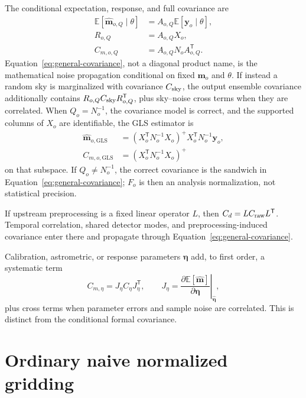 \documentclass[11pt]{article}
\newcommand{\E}{\mathbb{E}}
\newcommand{\trans}{\mathsf{T}}
\begin{document}
The conditional expectation, response, and full covariance are
\begin{align}
  \E[\widehat{\boldsymbol m}_{o,Q}\mid\theta]
    &= A_{o,Q}\E[\boldsymbol y_o\mid\theta],
  \label{eq:general-mean}\\
  R_{o,Q} &= A_{o,Q}X_o,
  \label{eq:general-response}\\
  C_{m,o,Q}
    &= A_{o,Q}N_oA_{o,Q}^\trans .
  \label{eq:general-covariance}
\end{align}
Equation~\eqref{eq:general-covariance}, not a diagonal product name, is the
mathematical noise propagation conditional on fixed \(\boldsymbol m_o\) and
\(\theta\). If instead a random sky is marginalized with covariance
\(C_{\rm sky}\), the output ensemble covariance additionally contains
\(R_{o,Q}C_{\rm sky}R_{o,Q}^\trans\), plus sky--noise cross terms when they are
correlated. When \(Q_o=N_o^{-1}\),
the covariance model is correct, and the supported columns of \(X_o\) are
identifiable, the GLS estimator is
\begin{align}
  \widehat{\boldsymbol m}_{o,\mathrm{GLS}}
    &= (X_o^\trans N_o^{-1}X_o)^{+}
       X_o^\trans N_o^{-1}\boldsymbol y_o,
  \label{eq:gls-estimator}\\
  C_{m,o,\mathrm{GLS}}
    &= (X_o^\trans N_o^{-1}X_o)^{+}
  \label{eq:gls-covariance}
\end{align}
on that subspace. If \(Q_o\neq N_o^{-1}\), the correct covariance is the
sandwich in Equation~\eqref{eq:general-covariance}; \(F_o\) is then an analysis
normalization, not statistical precision.

If upstream preprocessing is a fixed linear operator \(L\), then
\(C_d=L C_{\rm raw}L^\trans\). Temporal correlation, shared detector modes, and
preprocessing-induced covariance enter there and propagate through
Equation~\eqref{eq:general-covariance}.

Calibration, astrometric, or response parameters \(\boldsymbol\eta\) add, to
first order, a systematic term
\begin{equation}
 C_{m,\eta}=J_\eta C_\eta J_\eta^\trans,
 \qquad
 J_\eta=\left.
 \frac{\partial\E[\widehat{\boldsymbol m}]}{\partial\boldsymbol\eta}
 \right|_{\widehat{\boldsymbol\eta}},
 \label{eq:systematic-covariance}
\end{equation}
plus cross terms when parameter errors and sample noise are correlated. This
is distinct from the conditional formal covariance.

\section{Ordinary naive normalized gridding}
\end{document}
